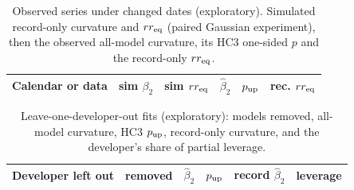 \documentclass[aps,pre,twocolumn,superscriptaddress,nofootinbib,9pt]{revtex4-2}
\newcommand{\rreq}{rr_{\rm eq}}
\begin{document}
\begin{table}[H]
\caption{Observed series under changed dates (exploratory). Simulated record-only curvature and $\rreq$ (paired Gaussian experiment), then the observed all-model curvature, its HC3 one-sided $p$ and the record-only $\rreq$.}
\label{tab:proxy}
\scriptsize\setlength{\tabcolsep}{2pt}
\begin{ruledtabular}
\begin{tabular}{p{}ccccc}
Calendar or data & sim $\beta_2$ & sim $\rreq$ & $\hat\beta_2$ & $p_{\rm up}$ & rec. $\rreq$ \\
\hline

\end{tabular}
\end{ruledtabular}
\end{table}

\begin{table}[H]
\caption{Leave-one-developer-out fits (exploratory): models removed, all-model curvature, HC3 $p_{\rm up}$, record-only curvature, and the developer's share of partial leverage.}
\label{tab:loo}
\footnotesize
\begin{ruledtabular}
\begin{tabular}{lccccc}
Developer left out & removed & $\hat\beta_2$ & $p_{\rm up}$ & record $\hat\beta_2$ & leverage \\
\hline

\end{tabular}
\end{ruledtabular}
\end{table}
\end{document}
